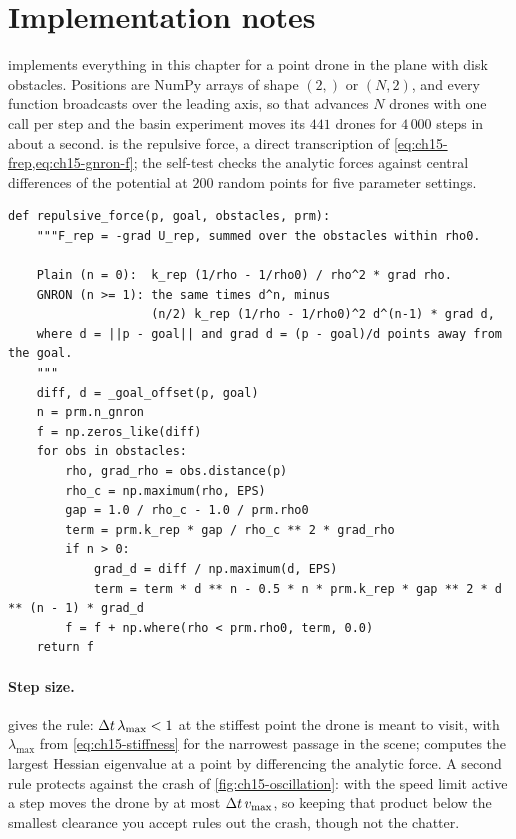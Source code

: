\section{Implementation notes}
\label{sec:ch15-implementation}

 implements everything in this chapter for
a point drone in the plane with disk obstacles. Positions are NumPy arrays
of shape $(2,)$ or $(N, 2)$, and every function broadcasts over the leading
axis, so that  advances $N$ drones with one call per
step and the basin experiment moves its $441$ drones for $4\,000$ steps in
about a second.  is the repulsive force, a direct
transcription of \cref{eq:ch15-frep,eq:ch15-gnron-f}; the self-test checks
the analytic forces against central differences of the potential at $200$
random points for five parameter settings.

\begin{lstlisting}[caption={The repulsive force (from \code{code/ch15\_potential\_fields.py}). \code{prm} holds the gains; \code{obs.distance(p)} returns the clearance $\rho$ and $\nabla\rho$; \code{prm.n\_gnron} is the exponent $n$ of \cref{eq:ch15-gnron-f}, $0$ for Khatib's original; \code{EPS} is $10^{-12}$.},label={lst:ch15-forces}]
def repulsive_force(p, goal, obstacles, prm):
    """F_rep = -grad U_rep, summed over the obstacles within rho0.

    Plain (n = 0):  k_rep (1/rho - 1/rho0) / rho^2 * grad rho.
    GNRON (n >= 1): the same times d^n, minus
                    (n/2) k_rep (1/rho - 1/rho0)^2 d^(n-1) * grad d,
    where d = ||p - goal|| and grad d = (p - goal)/d points away from the goal.
    """
    diff, d = _goal_offset(p, goal)
    n = prm.n_gnron
    f = np.zeros_like(diff)
    for obs in obstacles:
        rho, grad_rho = obs.distance(p)
        rho_c = np.maximum(rho, EPS)
        gap = 1.0 / rho_c - 1.0 / prm.rho0
        term = prm.k_rep * gap / rho_c ** 2 * grad_rho
        if n > 0:
            grad_d = diff / np.maximum(d, EPS)
            term = term * d ** n - 0.5 * n * prm.k_rep * gap ** 2 * d ** (n - 1) * grad_d
        f = f + np.where(rho < prm.rho0, term, 0.0)
    return f
\end{lstlisting}

\paragraph{Step size.}
 gives the rule: $\Delta t\,\lambda_{\max} < 1$ at the
stiffest point the drone is meant to visit, with $\lambda_{\max}$ from
\cref{eq:ch15-stiffness} for the narrowest passage in the scene;
 computes the largest Hessian eigenvalue at a point by
differencing the analytic force. A second rule protects against the crash
of \cref{fig:ch15-oscillation}: with the speed limit active a step moves
the drone by at most $\Delta t\,v_{\max}$, so keeping that product below the
smallest clearance you accept rules out the crash, though not the chatter.

